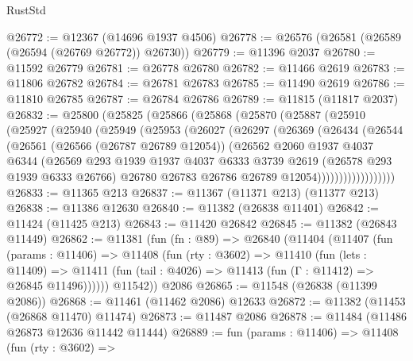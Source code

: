 \begin{lexlean}{RustStd}
\begin{coremodule}
@26772 := @12367 (@14696 @1937 @4506)
@26778 := @26576 (@26581 (@26589 (@26594 (@26769 @26772)) @26730))
@26779 := @11396 @2037
@26780 := @11592 @26779
@26781 := @26778 @26780
@26782 := @11466 @2619
@26783 := @11806 @26782
@26784 := @26781 @26783
@26785 := @11490 @2619
@26786 := @11810 @26785
@26787 := @26784 @26786
@26789 := @11815 (@11817 @2037)
@26832 := @25800
    (@25825
      (@25866
        (@25868
          (@25870
            (@25887
              (@25910
                (@25927
                  (@25940
                    (@25949
                      (@25953
                        (@26027
                          (@26297
                            (@26369
                              (@26434
                                (@26544
                                  (@26561
                                    (@26566 (@26787 @26789 @12054))
                                    (@26562
                                      @2060
                                      @1937
                                      @4037
                                      @6344
                                      (@26569
                                        @293
                                        @1939
                                        @1937
                                        @4037
                                        @6333
                                        @3739
                                        @2619
                                        (@26578 @293 @1939 @6333 @26766)
                                        @26780
                                        @26783
                                        @26786
                                        @26789
                                        @12054))))))))))))))))))
@26833 := @11365 @213
@26837 := @11367 (@11371 @213) (@11377 @213)
@26838 := @11386 @12630
@26840 := @11382 (@26838 @11401)
@26842 := @11424 (@11425 @213)
@26843 := @11420 @26842
@26845 := @11382 (@26843 @11449)
@26862 := @11381
    (fun (fn : @89) =>
    @26840
      (@11404
        (@11407
          (fun (params : @11406) =>
          @11408
            (fun (rty : @3602) =>
            @11410
              (fun (lets : @11409) =>
              @11411 (fun (tail : @4026) => @11413 (fun (Γ : @11412) => @26845 @11496))))))
        @11542))
    @2086
@26865 := @11548 (@26838 (@11399 @2086))
@26868 := @11461 (@11462 @2086) @12633
@26872 := @11382 (@11453 (@26868 @11470) @11474)
@26873 := @11487 @2086
@26878 := @11484 (@11486 @26873 @12636 @11442 @11444)
@26889 := fun (params : @11406) =>
  @11408
    (fun (rty : @3602) =>

\end{coremodule}
\end{lexlean}
